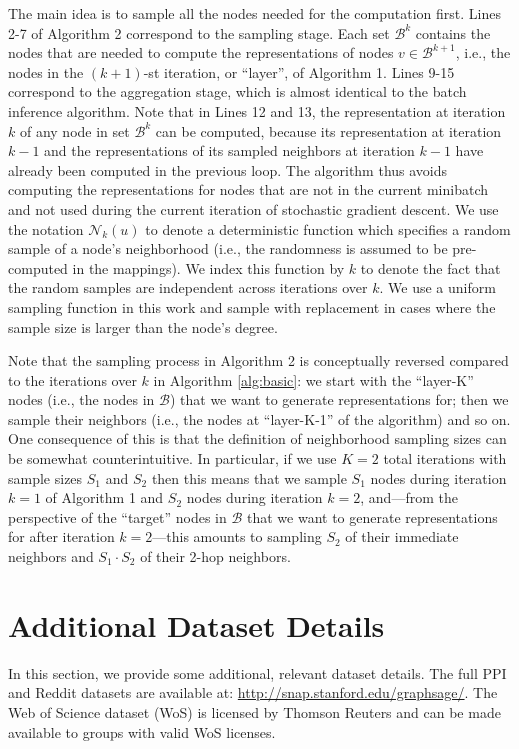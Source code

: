 The main idea is to sample all the nodes needed for the computation first. 
Lines 2-7 of Algorithm 2 correspond to the sampling stage. 
Each set $\mathcal{B}^k$ contains the nodes that are needed to compute the representations of
nodes $v \in \mathcal{B}^{k+1}$, i.e., the nodes in the $(k+1)$-st iteration, or ``layer'', of Algorithm 1.
Lines 9-15 correspond to the aggregation stage, which is almost identical to the batch inference
algorithm. 
Note that in Lines 12 and 13, the representation at iteration $k$ of any node in set $\mathcal{B}^k$ can be computed, because its representation at iteration $k-1$  and the representations of its sampled neighbors at iteration $k-1$ have already been computed
in the previous loop.
The algorithm thus avoids computing the representations for nodes that are not in the current
minibatch and not used during the current iteration of stochastic gradient descent.
We use the notation $\mathcal{N}_k(u)$ to denote a deterministic function which specifies a random sample of a node's neighborhood (i.e., the randomness is assumed to be pre-computed in the mappings).
We index this function by $k$ to denote the fact that the random samples are independent across iterations over $k$.
We use a uniform sampling function in this work and sample with replacement in cases where the sample size is larger than the node's degree. 

Note that the sampling process in Algorithm 2 is conceptually reversed compared to the iterations over $k$ in Algorithm \ref{alg:basic}: we start with the ``layer-K'' nodes (i.e., the nodes in $\mathcal{B}$) that we want to generate representations for; then we sample their neighbors (i.e., the nodes at ``layer-K-1'' of the algorithm) and so on.
One consequence of this is that the definition of neighborhood sampling sizes can be somewhat counterintuitive.
In particular, if we use $K=2$ total iterations with sample sizes $S_1$ and $S_2$ then this means that we sample $S_1$ nodes during iteration $k=1$ of Algorithm 1 and $S_2$ nodes during iteration $k=2$, and---from the perspective of the ``target'' nodes in $\mathcal{B}$ that we want to generate representations for after iteration $k=2$---this amounts to sampling $S_2$ of their immediate neighbors and $S_1\cdot S_2$ of their 2-hop neighbors. 


\section{Additional Dataset Details}

In this section, we provide some additional, relevant dataset details.
The full PPI and Reddit datasets are available at: \url{http://snap.stanford.edu/graphsage/}.
The Web of Science dataset (WoS) is licensed by Thomson Reuters and can be made available to groups with valid WoS licenses. 

